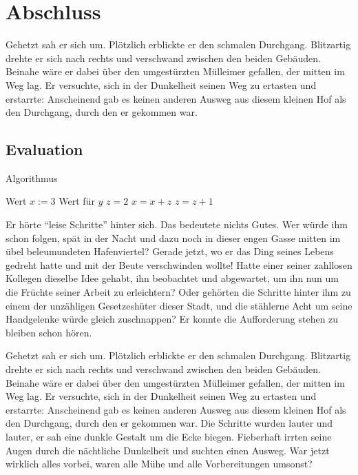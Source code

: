 
\chapter{Abschluss}
\label{Kapitel 3}
%
Gehetzt sah er sich um. Plötzlich erblickte er den schmalen
Durchgang. Blitzartig drehte er sich nach rechts und verschwand
zwischen den beiden Gebäuden. Beinahe wäre er dabei über den
umgestürzten Mülleimer gefallen, der mitten im Weg lag. Er
versuchte, sich in der Dunkelheit seinen Weg zu ertasten und
erstarrte: Anscheinend gab es keinen anderen Ausweg aus diesem
kleinen Hof als den Durchgang, durch den er gekommen war.

\section{Evaluation}
\label{Kapitel_3_-_Unterkapitel_1}
%
    \begin{algorithm}[t]
    \centering
    \caption[Ein Algorithmus]{Algorithmus} \label{algo_1}
    \begin{algorithmic}
    \REQUIRE Wert $x :=3$
    \ENSURE Wert für $y$
    \STATE $z = 2$
    \STATE $x = x + z$
    \STATE $z = z + 1$
    \ENDFOR
    \ENDWHILE
    \end{algorithmic}
    \end{algorithm}


Er hörte \enquote{leise Schritte} hinter sich. Das bedeutete
nichts Gutes. Wer würde ihm schon folgen, spät in der Nacht und
dazu noch in dieser engen Gasse mitten im übel beleumundeten
Hafenviertel? Gerade jetzt, wo er das Ding seines Lebens gedreht
hatte und mit der Beute verschwinden wollte! Hatte einer seiner
zahllosen Kollegen dieselbe Idee gehabt, ihn beobachtet und
abgewartet, um ihn nun um die Früchte seiner Arbeit zu
erleichtern? Oder gehörten die Schritte hinter ihm zu einem der
unzähligen Gesetzeshüter dieser Stadt, und die stählerne Acht um
seine Handgelenke würde gleich zuschnappen? Er konnte die
Aufforderung stehen zu bleiben
schon hören.

Gehetzt sah er sich um. Plötzlich erblickte er den schmalen
Durchgang. Blitzartig drehte er sich nach rechts und verschwand
zwischen den beiden Gebäuden. Beinahe wäre er dabei über den
umgestürzten Mülleimer gefallen, der mitten im Weg lag. Er
versuchte, sich in der Dunkelheit seinen Weg zu ertasten und
erstarrte: Anscheinend gab es keinen anderen Ausweg aus diesem
kleinen Hof als den Durchgang, durch den er gekommen war. Die
Schritte wurden lauter und lauter, er sah eine dunkle Gestalt um
die Ecke biegen. Fieberhaft irrten seine Augen durch die
nächtliche Dunkelheit und suchten einen Ausweg. War jetzt wirklich
alles vorbei, waren alle Mühe und alle Vorbereitungen umsonst?

